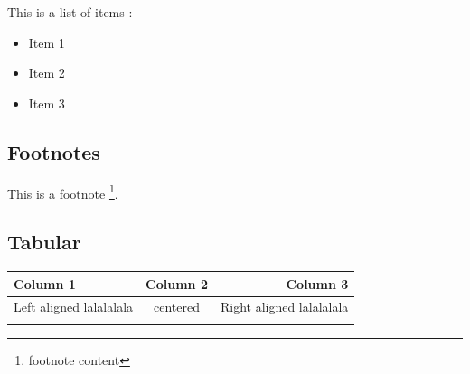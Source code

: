 This is a list of items :

\begin{itemize}
    \item Item 1
    \item Item 2
    \item Item 3
\end{itemize}

\subsection{Footnotes}

This is a footnote \footnote{footnote content}.

\subsection{Tabular}


\begin{center}
    \begin{tabular}{|l|c|r|} %
        \hline
        \rowcolor{white!75!black} \textbf{Column 1} & \textbf{Column 2} & \textbf{Column 3} \\
        \hline
        Left aligned lalalalala & centered & Right aligned lalalalala\\
        \hline
         & & \\
        \hline
    \end{tabular}
\end{center}
